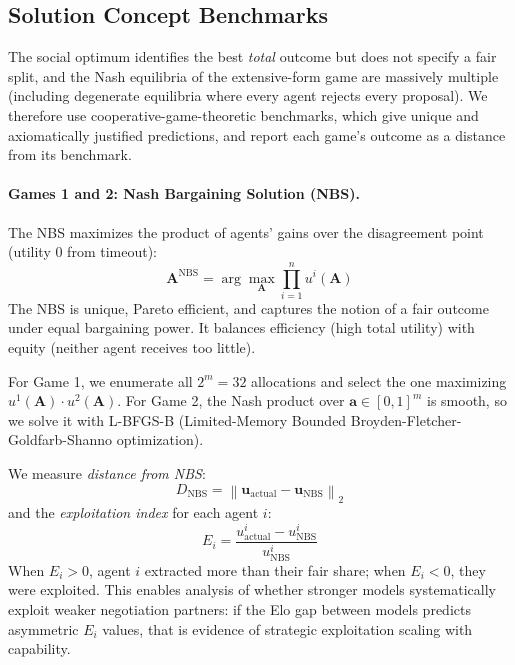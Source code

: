 \subsection{Solution Concept Benchmarks}
\label{sec:solution_concepts}

The social optimum identifies the best \emph{total} outcome but does not specify a fair split, and the Nash equilibria of the extensive-form game are massively multiple (including degenerate equilibria where every agent rejects every proposal).
We therefore use cooperative-game-theoretic benchmarks, which give unique and axiomatically justified predictions, and report each game's outcome as a distance from its benchmark.

\paragraph{Games 1 and 2: Nash Bargaining Solution (NBS).}
The NBS maximizes the product of agents' gains over the disagreement point (utility 0 from timeout):
\begin{equation}
    \bm{A}^{\text{NBS}} = \arg\max_{\bm{A}} \prod_{i=1}^{n} u^i(\bm{A})
\end{equation}
The NBS is unique, Pareto efficient, and captures the notion of a fair outcome under equal bargaining power.
It balances efficiency (high total utility) with equity (neither agent receives too little).

For Game 1, we enumerate all $2^m = 32$ allocations and select the one maximizing $u^1(\bm{A}) \cdot u^2(\bm{A})$.
For Game 2, the Nash product over $\bm{a} \in [0,1]^m$ is smooth, so we solve it with L-BFGS-B (Limited-Memory Bounded Broyden-Fletcher-Goldfarb-Shanno optimization).

We measure \emph{distance from NBS}:
\begin{equation}
    D_{\text{NBS}} = \left\|\bm{u}_{\text{actual}} - \bm{u}_{\text{NBS}}\right\|_2
\end{equation}
and the \emph{exploitation index} for each agent $i$:
\begin{equation}
    E_i = \frac{u^i_{\text{actual}} - u^i_{\text{NBS}}}{u^i_{\text{NBS}}}
\end{equation}
When $E_i > 0$, agent $i$ extracted more than their fair share; when $E_i < 0$, they were exploited.
This enables analysis of whether stronger models systematically exploit weaker negotiation partners: if the Elo gap between models predicts asymmetric $E_i$ values, that is evidence of strategic exploitation scaling with capability.

